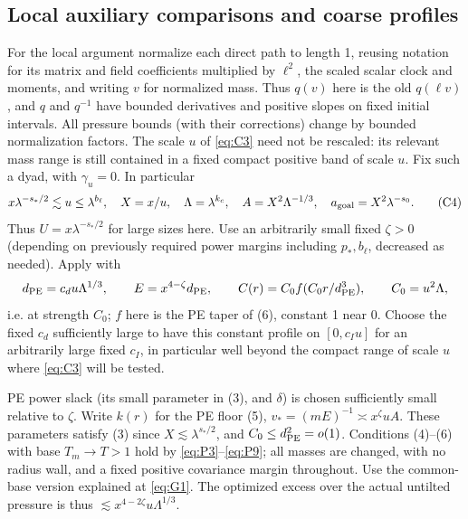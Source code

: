 \subsection{Local auxiliary comparisons and coarse profiles}

For the local argument normalize each direct path to length 1, reusing notation for its matrix and field coefficients multiplied by \(\ell^2\), the scaled scalar clock and moments, and writing \(v\) for normalized mass. Thus \(q(v)\) here is the old \(q(\ell v)\), and \(q\) and \(q^{-1}\) have bounded derivatives and positive slopes on fixed initial intervals.
All pressure bounds (with their corrections) change by bounded normalization factors. The scale \(u\) of \eqref{eq:C3} need not be rescaled: its relevant mass range is still contained in a fixed compact positive band of scale \(u\). Fix such a dyad, with \(\gamma_u=0\). In particular
\[
 x\lambda^{-s_*/2}\lesssim u\le\lambda^{b_\ell},\quad X=x/u,\quad
 \Lambda=\lambda^{k_c},\quad A=X^2\Lambda^{-1/3},\quad a_{\rm goal}=X^2\lambda^{-s_0}.
                                                                    \tag{C4}\label{eq:C4}
\]
Thus \(U=x\lambda^{-s_*/2}\) for large sizes here. Use an arbitrarily small fixed \(\zeta>0\) (depending on previously required power margins including \(p_*,b_\ell\), decreased as needed). Apply \cite[Proposition~6.6]{PE} with
\[
 d_{\rm PE}=c_d u\Lambda^{1/3},\qquad E=x^{4-\zeta}d_{\rm PE},\qquad
 C(r)=C_0 f(C_0 r/d_{\rm PE}^3),\qquad C_0=u^2\Lambda ,
\]
i.e. at strength \(C_0\); \(f\) here is the PE taper of (6), constant 1 near 0. Choose the fixed \(c_d\) sufficiently large to have this constant profile on \([0,c_I u]\) for an arbitrarily large fixed \(c_I\), in particular well beyond the compact range of scale \(u\) where \eqref{eq:C3} will be tested.

PE power slack (its small parameter in (3), and \(\delta\)) is chosen sufficiently small relative to \(\zeta\). Write \(k(r)\) for the PE floor (5), \(v_*=(mE)^{-1}\asymp x^\zeta u A\). These parameters satisfy (3) since \(X\lesssim\lambda^{s_*/2}\), and \(C_0\le d_{\rm PE}^2=o(1)\). Conditions (4)--(6) with base \(T_m\to T>1\) hold by \eqref{eq:P3}--\eqref{eq:P9}; all masses are changed, with no radius wall, and a fixed positive covariance margin throughout. Use the common-base version explained at \eqref{eq:G1}. The optimized excess over the actual untilted pressure is thus \(\lesssim x^{4-2\zeta}u\Lambda^{1/3}\).

